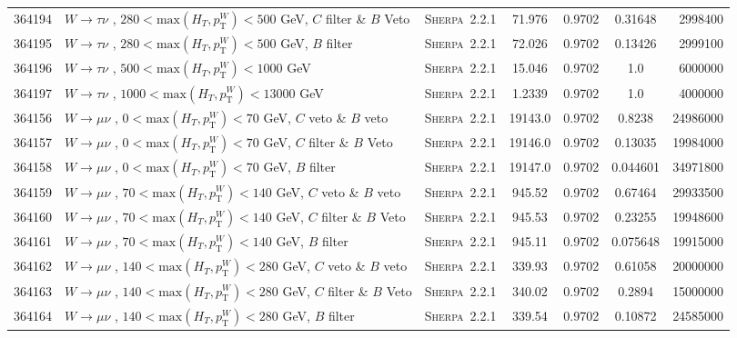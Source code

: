 \begin{table}[!htb]
{\begin{tabular}{|c|l|c|c|c|c|r|}
      364194 & $W \to \tau\nu $ , $280<\text{max}(H_T,p_{\text{T}}^W)<500$ GeV,  $C$ filter \& $B$ Veto & \textsc{Sherpa}~2.2.1 &71.976    & 0.9702 & 0.31648 & 2998400 \\
      364195 & $W \to \tau\nu $ , $280<\text{max}(H_T,p_{\text{T}}^W)<500$ GeV, $B$ filter & \textsc{Sherpa}~2.2.1 &             72.026    & 0.9702 & 0.13426 & 2999100 \\
      364196 & $W \to \tau\nu $ , $500<\text{max}(H_T,p_{\text{T}}^W)<1000$ GeV                      & \textsc{Sherpa}~2.2.1 &   15.046    & 0.9702 & 1.0 	& 6000000 \\
      364197 & $W \to \tau\nu $ , $1000<\text{max}(H_T,p_{\text{T}}^W)<13000$ GeV                       & \textsc{Sherpa}~2.2.1 &1.2339    & 0.9702 & 1.0 	& 4000000 \\
      \hline
      364156 & $W \to \mu\nu $ , $0<\text{max}(H_T,p_{\text{T}}^W)<70$ GeV, $C$ veto \& $B$ veto & \textsc{Sherpa}~2.2.1 &      19143.0        & 0.9702& 0.8238  & 24986000 \\
      364157 & $W \to \mu\nu $ , $0<\text{max}(H_T,p_{\text{T}}^W)<70$ GeV,  $C$ filter \& $B$ Veto & \textsc{Sherpa}~2.2.1 &   19146.0        & 0.9702& 0.13035 & 19984000 \\
      364158 & $W \to \mu\nu $ , $0<\text{max}(H_T,p_{\text{T}}^W)<70$ GeV, $B$ filter & \textsc{Sherpa}~2.2.1 &                19147.0        & 0.9702& 0.044601& 34971800 \\
      364159 & $W \to \mu\nu $ , $70<\text{max}(H_T,p_{\text{T}}^W)<140$ GeV, $C$ veto \& $B$ veto & \textsc{Sherpa}~2.2.1 &    945.52         & 0.9702& 0.67464 & 29933500 \\
      364160 & $W \to \mu\nu $ , $70<\text{max}(H_T,p_{\text{T}}^W)<140$ GeV,  $C$ filter \& $B$ Veto & \textsc{Sherpa}~2.2.1 & 945.53         & 0.9702& 0.23255 & 19948600 \\
      364161 & $W \to \mu\nu $ , $70<\text{max}(H_T,p_{\text{T}}^W)<140$ GeV, $B$ filter & \textsc{Sherpa}~2.2.1 &              945.11         & 0.9702& 0.075648& 19915000 \\
      364162 & $W \to \mu\nu $ , $140<\text{max}(H_T,p_{\text{T}}^W)<280$ GeV, $C$ veto \& $B$ veto & \textsc{Sherpa}~2.2.1 &   339.93         & 0.9702& 0.61058 & 20000000 \\
      364163 & $W \to \mu\nu $ , $140<\text{max}(H_T,p_{\text{T}}^W)<280$ GeV,  $C$ filter \& $B$ Veto & \textsc{Sherpa}~2.2.1 &340.02         & 0.9702& 0.2894  & 15000000 \\
      364164 & $W \to \mu\nu $ , $140<\text{max}(H_T,p_{\text{T}}^W)<280$ GeV, $B$ filter & \textsc{Sherpa}~2.2.1 &             339.54         & 0.9702& 0.10872 & 24585000 \\

\end{tabular}}
\end{table}
